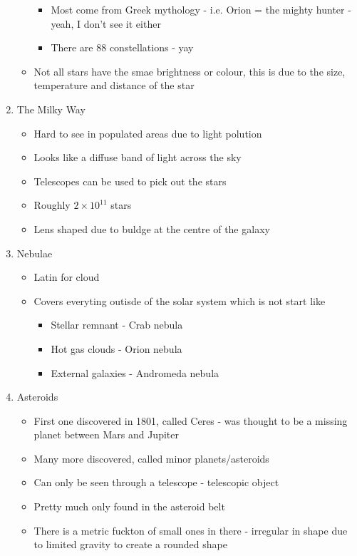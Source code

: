 \documentclass[a4paper, 11pt]{article}
\begin{document}
\begin{enumerate}
\begin{itemize}
				\begin{itemize}
					\item Most come from Greek mythology - i.e. Orion = the mighty hunter - yeah, I don't see it either
					\item There are 88 constellations - yay
				\end{itemize}
			\item Not all stars have the smae brightness or colour, this is due to the size, temperature and distance of the star
		\end{itemize}
	\item The Milky Way
		\begin{itemize}
			\item Hard to see in populated areas due to light polution
			\item Looks like a diffuse band of light across the sky
			\item Telescopes can be used to pick out the stars
			\item Roughly \(2\times10^{11}\) stars
			\item Lens shaped due to buldge at the centre of the galaxy
		\end{itemize}
	\item Nebulae
		\begin{itemize}
			\item Latin for cloud
			\item Covers everyting outisde of the solar system which is not start like
				\begin{itemize}
					\item Stellar remnant - Crab nebula
					\item Hot gas clouds - Orion nebula
					\item External galaxies - Andromeda nebula
				\end{itemize}
		\end{itemize}
	\item Asteroids
		\begin{itemize}
			\item First one discovered in 1801, called Ceres - was thought to be a missing planet between Mars and Jupiter
			\item Many more discovered, called minor planets/asteroids
			\item Can only be seen through a telescope - telescopic object
			\item Pretty much only found in the asteroid belt
			\item There is a metric fuckton of small ones in there - irregular in shape due to limited gravity to create a rounded shape

\end{itemize}
\end{enumerate}
\end{document}
